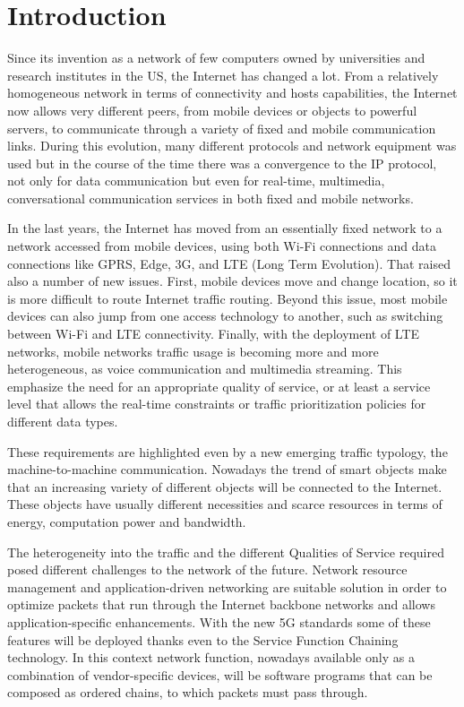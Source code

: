 \chapter{Introduction}
\label{chap:intro}
Since its invention as a network of few computers owned by universities and
research institutes in the US, the Internet has changed a lot. From a
relatively homogeneous network in terms of connectivity and hosts capabilities,
the Internet now allows very different peers, from mobile devices or objects to
powerful servers, to communicate through a variety of fixed and mobile
communication links. During this evolution, many different protocols and
network equipment was used but in the course of the time there was a
convergence to the IP protocol, not only for data communication but even for
real-time, multimedia, conversational communication services in both fixed and
mobile networks.

In the last years, the Internet has moved from an essentially fixed network to
a network accessed from mobile devices, using both Wi-Fi connections and data
connections like GPRS, Edge, 3G, and LTE (Long Term Evolution). That raised
also a number of new issues. First, mobile devices move and change location, so
it is more difficult to route Internet traffic routing. Beyond this issue, most
mobile devices can also jump from one access technology to another, such as
switching between Wi-Fi and LTE connectivity. Finally, with the deployment of
LTE networks, mobile networks traffic usage is becoming more and more
heterogeneous, as voice communication and multimedia streaming. This emphasize
the need for an appropriate quality of service, or at least a service level
that allows the real-time constraints or traffic prioritization policies for
different data types.

These requirements are highlighted even by a new emerging traffic typology, the
machine-to-machine communication. Nowadays the trend of smart objects make that
an increasing variety of different objects will be connected to the Internet.
These objects have usually different necessities and scarce resources in terms
of energy, computation power and bandwidth.

The heterogeneity into the traffic and the different Qualities of Service
required posed different challenges to the network of the future. Network
resource management and application-driven networking are suitable solution in
order to optimize packets that run through the Internet backbone networks and
allows application-specific enhancements. With the new 5G standards some of
these features will be deployed thanks even to the Service Function Chaining
technology. In this context network function, nowadays available only as a
combination of vendor-specific devices, will be software programs that can be
composed as ordered chains, to which packets must pass through. 

